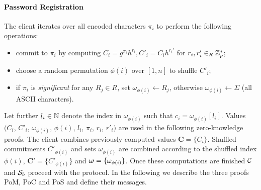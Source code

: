 \paragraph{Password Registration}
The client iterates over all encoded characters $\pi_i$ to perform the following operations:
\begin{itemize}
  \item commit to $\pi_i$ by computing $C_i=g^{\pi_i}h^{r_i}, C'_i=C_i h^{r_i'}$ for $r_i,r'_i\in_R\mathbb{Z}^\ast_p$;
  \item choose a random permutation $\phi(i)$ over $[1,n]$ to shuffle $C'_i$;
  \item if $\pi_i$ is \emph{significant} for any $R_j\in R$, set $\omega_{\phi(i)}\gets R_j$, otherwise $\omega_{\phi(i)}\gets\Sigma$ (all \ac{ASCII} characters).
\end{itemize}
Let further $l_i\in\mathbb{N}$ denote the index in $\omega_{\phi(i)}$ such that $c_i=\omega_{\phi(i)}[l_i]$.
Values $(C_i$, $C'_i$, $\omega_{\phi(i)}$, $\phi(i)$, $l_i$, $\pi_i$, $r_i$, $r'_i)$ are used in the following zero-knowledge proofs.
The client combines previously computed values $\bm C = \{C_{i}\}$.
Shuffled commitments $C'_{\phi(i)}$ and sets $\omega_{\phi(i)}$ are combined according to the shuffled index $\phi(i)$, \ie $\bm C' = \{C'_{\phi(i)}\}$ and $\boldsymbol{\mathbf{\omega}} = \{\omega_{\phi(i)}\}$.
Once these computations are finished $\mathcal{C}$ and $\mathcal{S}_b$ proceed with the protocol.
In the following we describe the three proofs \ac{PoM}, \ac{PoC} and \ac{PoS} and define their messages.


